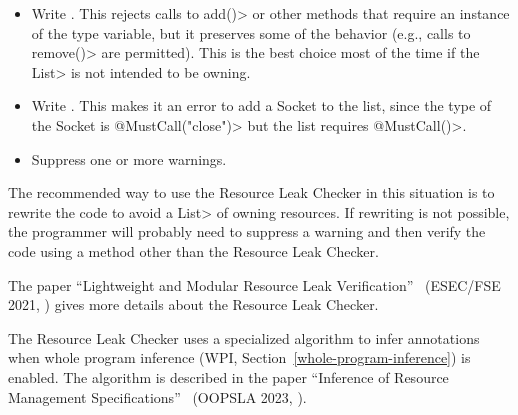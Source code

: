\begin{itemize}
\item Write . This rejects calls to \<add()>
or other methods that require an instance of the type variable, but it
preserves some of the behavior (e.g., calls to \<remove()> are permitted).
This is the best choice most of the time if the \<List> is not intended to
be owning.
\item Write . This makes it an error to
add a Socket to the list, since the type of the Socket is
\<@MustCall("close")> but the list requires \<@MustCall()>.
\item Suppress one or more warnings.
\end{itemize}

The recommended way to use the Resource Leak Checker in this situation is
to rewrite the code to avoid a \<List> of owning resources. If rewriting is
not possible, the programmer will probably need to suppress a warning and
then verify the code using a method other than the Resource Leak Checker.



The paper ``Lightweight and Modular Resource Leak
Verification''~\cite{KelloggSSE2021} (ESEC/FSE 2021,
)
gives more details about the Resource Leak Checker.

The Resource Leak Checker uses a specialized algorithm to infer annotations
when whole program inference (WPI, Section~\ref{whole-program-inference})
is enabled.  The algorithm is described in the paper ``Inference of
Resource Management Specifications''~\cite{ShadabGTEKLLS2023} (OOPSLA 2023,
).


